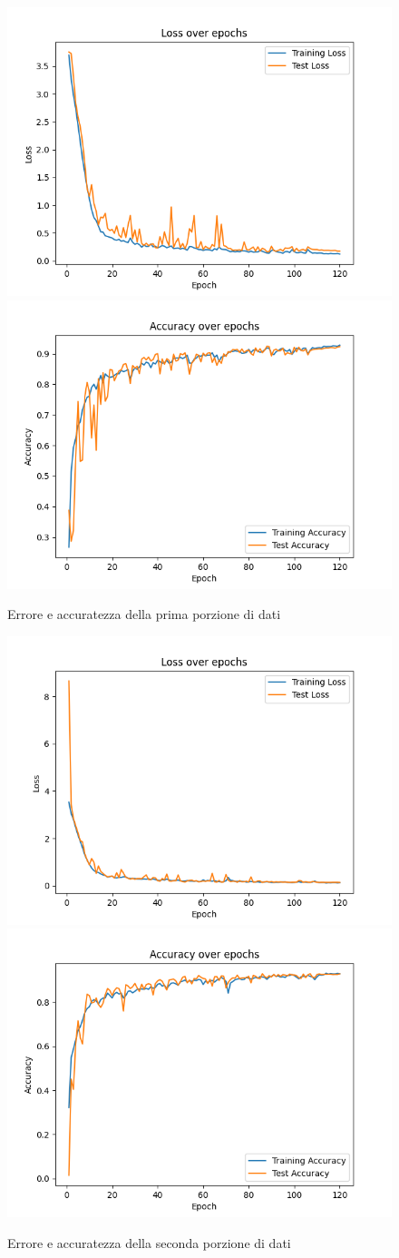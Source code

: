 \begin{figure}[!ht]
	\centering
	\includegraphics[width=0.4\columnwidth]{Immagini/fold_0_loss.png} \includegraphics[width=0.4\columnwidth]{Immagini/fold_0_accuracy.png}
	\caption{Errore e accuratezza della prima porzione di dati}
	\label{fig:loss e accuratezza della prima porzione di dati}
\end{figure}

\begin{figure}
	\centering
	\includegraphics[width=0.4\columnwidth]{Immagini/fold_1_loss.png} \includegraphics[width=0.4\columnwidth]{Immagini/fold_1_accuracy.png}
	\caption{Errore e accuratezza della seconda porzione di dati}
	\label{fig:loss e accuratezza della seconda porzione di dati}
\end{figure}


